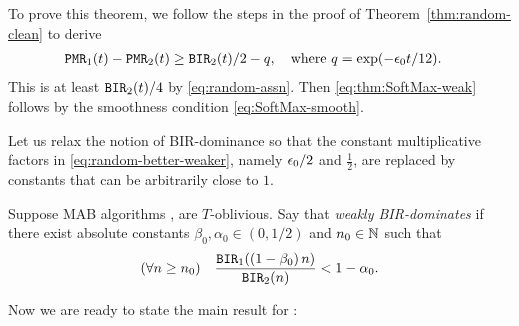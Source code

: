To prove this theorem, we follow the steps in the proof of Theorem~\ref{thm:random-clean} to derive \begin{align*}
\mathtt{PMR}_1(t) - \mathtt{PMR}_2(t)
    &\geq \mathtt{BIR}_2(t)/2 -q,
    \quad \text{where $q = \exp(-\epsilon_0 t/12)$.}
\end{align*}
This is at least $\mathtt{BIR}_2(t)/4$ by \eqref{eq:random-assn}. Then \eqref{eq:thm:SoftMax-weak} follows by the smoothness condition \eqref{eq:SoftMax-smooth}.


Let us relax the notion of BIR-dominance so that the constant multiplicative factors in \eqref{eq:random-better-weaker}, namely
 $\epsilon_0/2$ and $\tfrac12$, are replaced by constants that can be arbitrarily close to $1$.

\begin{definition}
Suppose MAB algorithms \alg[1],  \alg[2] are $T$-oblivious. Say that
\alg[1] \emph{weakly BIR-dominates} \alg[2] if there exist absolute  constants $\beta_0, \alpha_0\in (0, 1/2)$ and $n_0\in\mathbb{N}$ such that
 \begin{align}\label{eq:SoftMax-better}
   (\forall n\geq n_0) \quad
   \frac{\mathtt{BIR}_1((1-\beta_0)\, n)}{\mathtt{BIR}_2(n)} <1-\alpha_0.
 \end{align}
 \end{definition}


Now we are ready to state the main result for \SoftMaxRandom:

